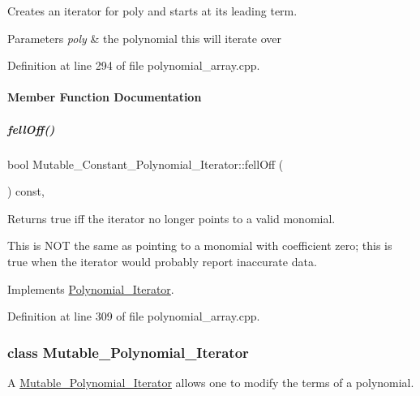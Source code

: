 Creates an iterator for {\ttfamily poly} and starts at its leading term. 


\begin{DoxyParams}{Parameters}
{\em poly} & the polynomial {\ttfamily this} will iterate over \\
\hline
\end{DoxyParams}


Definition at line 294 of file polynomial\+\_\+array.\+cpp.



\paragraph{Member Function Documentation}
\mbox{\label{group___iterator_group_a4c7718296e7be3e5c2b942fa71dd69f2}} 
\subparagraph{\texorpdfstring{fell\+Off()}{fellOff()}}
{\footnotesize\ttfamily bool Mutable\+\_\+\+Constant\+\_\+\+Polynomial\+\_\+\+Iterator\+::fell\+Off (\begin{DoxyParamCaption}{ }\end{DoxyParamCaption}) const\hspace{0.3cm}{\ttfamily [override]}, {\ttfamily [virtual]}}

\begin{DoxyReturn}{Returns}
true iff the iterator no longer points to a valid monomial.
\end{DoxyReturn}
This is N\+OT the same as pointing to a monomial with coefficient zero; this is true when the iterator would probably report inaccurate data. 

Implements \hyperlink{group___iterator_group_ac571e120134088d6067718bbad513e2d}{Polynomial\+\_\+\+Iterator}.



Definition at line 309 of file polynomial\+\_\+array.\+cpp.

\label{class_mutable___polynomial___iterator}
\subsubsection{class Mutable\+\_\+\+Polynomial\+\_\+\+Iterator}
A \hyperlink{group___iterator_group_class_mutable___polynomial___iterator}{Mutable\+\_\+\+Polynomial\+\_\+\+Iterator} allows one to modify the terms of a polynomial. 

